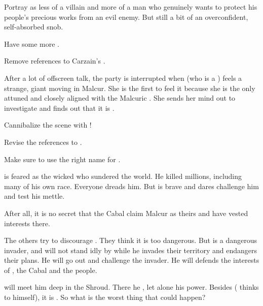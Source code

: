 \begin{garbage}
\begin{changes}
    Portray \Teshrial{} as less of a villain and more of a man who genuinely wants to protect his people's precious works from an evil enemy. 
    But still a bit of an overconfident, self-absorbed snob. 
    
    Have some more . 
    
    
    Remove references to Carzain's \vertexspike. 
    
    After a lot of offscreen talk, the party is interrupted when \Achsah{} (who is a ) feels a strange, giant \vertex{} moving in Malcur. 
    She is the first \resphan{} to feel it because she is the only  attuned and closely aligned with the Malcuric \Nexus. 
    She sends her mind out to investigate and finds out that it is \Ishnaruchaefir. 
    
    Cannibalize the \quo{\VertexSpike} scene with \ChyrieEsmerel! 
    
    Revise the references to . 
    
    Make sure to use the right name for \emph{\WanderersInDarkness}. 
    
    \Ishnaruchaefir{} is feared as the wicked  who sundered the world. 
    He killed millions, including many of his own race. 
    Everyone dreads him. 
    But \Teshrial{} is brave and dares challenge him and test his mettle. 
    
    After all, it is no secret that the Cabal claim Malcur as theirs and have vested interests there. 
    
    The others try to discourage \Teshrial.
    They think it is too dangerous. 
    But \Ishnaruchaefir{} is a dangerous invader, and \Teshrial{} will not stand idly by while he invades their territory and endangers their plans. 
    He will go out and challenge the invader. 
    He will defends the interests of \CiriathSepher, the Cabal and the \resphan{} people. 
    
    \Teshrial{} will meet him deep in the Shroud. 
    There he , let alone his \xsic{} power. 
    Besides (\Teshrial{} thinks to himself), it is . 
    So what is the worst thing that could happen?  
    

\end{changes}
\end{garbage}
